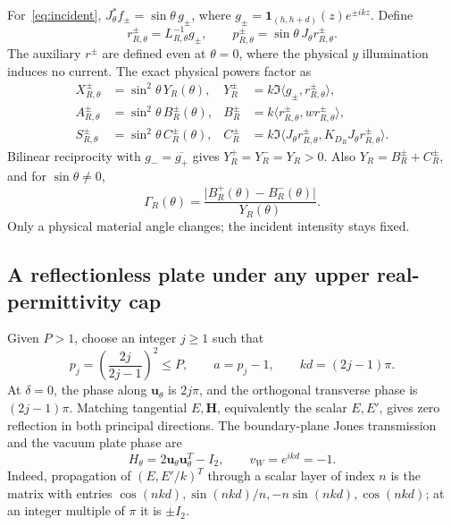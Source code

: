\documentclass[11pt]{article}
\newcommand{\uvec}{\mathbf u_\theta}
\newcommand{\ip}[2]{\langle #1,#2\rangle}
\newcommand{\abs}[1]{\lvert #1\rvert}
\begin{document}
For~\eqref{eq:incident}, $J_\theta^*f_\pm=\sin\theta\,g_\pm$, where $g_\pm=\mathbf1_{(h,h+d)}(z)e^{\pm ikz}$. Define
\begin{equation}\label{eq:normalized}
 r_{R,\theta}^\pm=L_{R,\theta}^{-1}g_\pm,\qquad
 p_{R,\theta}^\pm=\sin\theta\,J_\theta r_{R,\theta}^\pm.
\end{equation}
The auxiliary $r^\pm$ are defined even at $\theta=0$, where the physical $y$ illumination induces no current. The exact physical powers factor as
\begin{equation}\label{eq:factorization}
 \begin{aligned}
 X_{R,\theta}^\pm&=\sin^2\theta\,Y_R(\theta),
 &Y_R^\pm&=k\Im\ip{g_\pm}{r_{R,\theta}^\pm},\\
 A_{R,\theta}^\pm&=\sin^2\theta\,B_R^\pm(\theta),
 &B_R^\pm&=k\ip{r_{R,\theta}^\pm}{wr_{R,\theta}^\pm},\\
 S_{R,\theta}^\pm&=\sin^2\theta\,C_R^\pm(\theta),
 &C_R^\pm&=k\Im\ip{J_\theta r_{R,\theta}^\pm}{K_{D_R}J_\theta r_{R,\theta}^\pm}.
 \end{aligned}
\end{equation}
Bilinear reciprocity with $g_-=\overline{g_+}$ gives $Y_R^+=Y_R^-=Y_R>0$. Also $Y_R=B_R^\pm+C_R^\pm$, and for $\sin\theta\ne0$,
\begin{equation}\label{eq:aux-ratio}
 \Gamma_R(\theta)=\frac{\abs{B_R^+(\theta)-B_R^-(\theta)}}{Y_R(\theta)}.
\end{equation}
Only a physical material angle changes; the incident intensity stays fixed.

\subsection{A reflectionless plate under any upper real-permittivity cap}
Given $P>1$, choose an integer $j\geq1$ such that
\begin{equation}\label{eq:plate-design}
 p_j=\left(\frac{2j}{2j-1}\right)^2\leq P,\qquad
 a=p_j-1,\qquad kd=(2j-1)\pi.
\end{equation}
At $\delta=0$, the phase along $\uvec$ is $2j\pi$, and the orthogonal transverse phase is $(2j-1)\pi$. Matching tangential $E,\mathbf H$, equivalently the scalar $E,E'$, gives zero reflection in both principal directions. The boundary-plane Jones transmission and the vacuum plate phase are
\begin{equation}\label{eq:jones}
 H_\theta=2\uvec\uvec^T-I_2,\qquad v_W=e^{ikd}=-1.
\end{equation}
Indeed, propagation of $(E,E'/k)^T$ through a scalar layer of index $n$ is the matrix with entries $\cos(nkd),\sin(nkd)/n,-n\sin(nkd),\cos(nkd)$; at an integer multiple of $\pi$ it is $\pm I_2$.
\end{document}
